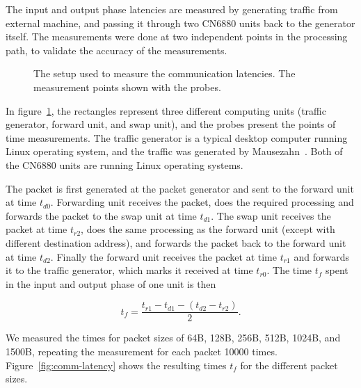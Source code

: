 The input and output phase latencies are measured by generating traffic from external machine, and passing it through two CN6880 units back to the generator itself. The measurements were done at two independent points in the processing path, to validate the accuracy of the measurements.

\begin{figure}[]
  \begin{center}
    
    \caption{The setup used to measure the communication latencies. The measurement points shown with the probes.}
    \label{fig:comm-setup}
  \end{center}
\end{figure}

In figure~\ref{fig:comm-setup}, the rectangles represent three different computing units (traffic generator, forward unit, and swap unit), and the probes present the points of time measurements. The traffic generator is a typical desktop computer running Linux operating system, and the traffic was generated by Mausezahn~\cite{mausezahn}. Both of the CN6880 units are running Linux operating systems.

The packet is first generated at the packet generator and sent to the forward unit at time $t_{d0}$. Forwarding unit receives the packet, does the required processing and forwards the packet to the swap unit at time $t_{d1}$. The swap unit receives the packet at time $t_{r2}$, does the same processing as the forward unit (except with different destination address), and forwards the packet back to the forward unit at time $t_{d2}$. Finally the forward unit receives the packet at time $t_{r1}$ and forwards it to the traffic generator, which marks it received at time $t_{r0}$. The time $t_{f}$ spent in the input and output phase of one unit is then

\begin{equation}
  \label{eq:1}
  t_{f} = \frac{t_{r1} - t_{d1} - (t_{d2} - t_{r2})}{2}.
\end{equation}

We measured the times for packet sizes of 64B, 128B, 256B, 512B, 1024B, and 1500B, repeating the measurement for each packet 10000 times. Figure~\ref{fig:comm-latency} shows the resulting times $t_{f}$ for the different packet sizes.

